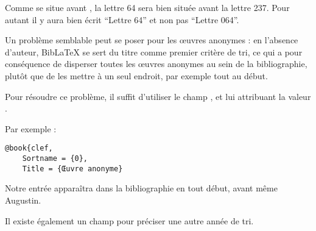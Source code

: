Comme  se situe avant , la lettre 64 sera bien située avant la lettre 237. Pour autant il y aura bien écrit \enquote{Lettre 64} et non pas \enquote{Lettre 064}.

Un problème semblable peut se poser pour les œuvres anonymes : en l'absence d'auteur, BibLaTeX se sert du titre comme premier critère de tri, ce qui a pour conséquence de disperser toutes les œuvres anonymes au sein de la bibliographie, plutôt que de les mettre à un seul endroit, par exemple tout au début.

Pour résoudre ce problème, il suffit d'utiliser le champ , et lui attribuant la valeur .

Par exemple :

\begin{verbatim}
@book{clef,
	Sortname = {0},
	Title = {Œuvre anonyme}
\end{verbatim}

Notre entrée  apparaîtra dans la bibliographie en tout début, avant même Augustin.

Il existe également un champ  pour préciser une autre année de tri. 
